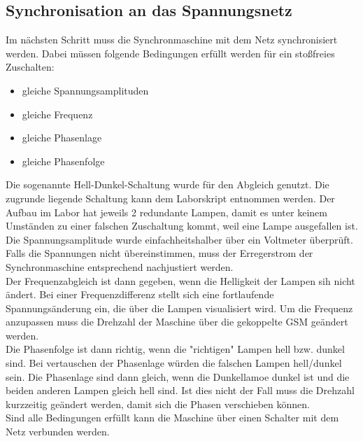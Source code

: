 \subsection{Synchronisation an das Spannungsnetz}
Im nächsten Schritt muss die Synchronmaschine mit dem Netz synchronisiert werden. Dabei müssen folgende Bedingungen erfüllt werden für ein stoßfreies Zuschalten:
\begin{itemize}
    \item gleiche Spannungsamplituden
    \item gleiche Frequenz
    \item gleiche Phasenlage
    \item gleiche Phasenfolge
\end{itemize}
Die sogenannte Hell-Dunkel-Schaltung wurde für den Abgleich genutzt. Die zugrunde liegende Schaltung kann dem Laborskript entnommen werden. Der Aufbau im Labor hat jeweils 2 redundante Lampen, damit es unter keinem Umständen zu einer falschen Zuschaltung kommt, weil eine Lampe ausgefallen ist.\\
Die Spannungsamplitude wurde einfachheitshalber über ein Voltmeter überprüft. Falls die Spannungen nicht übereinstimmen, muss der Erregerstrom der Synchronmaschine entsprechend nachjustiert werden.\\
Der Frequenzabgleich ist dann gegeben, wenn die Helligkeit der Lampen sih nicht ändert. Bei einer Frequenzdifferenz  stellt sich eine fortlaufende Spannungsänderung ein, die über die Lampen visualisiert wird. Um die Frequenz anzupassen muss die Drehzahl der Maschine über die gekoppelte GSM geändert werden.\\
Die Phasenfolge ist dann richtig, wenn die "richtigen" Lampen hell bzw. dunkel sind. Bei vertauschen der Phasenlage würden die falschen Lampen hell/dunkel sein. 
Die Phasenlage sind dann gleich, wenn die Dunkellamoe dunkel ist und die beiden anderen Lampen gleich hell sind. Ist dies nicht der Fall muss die Drehzahl kurzzeitig geändert werden, damit sich die Phasen verschieben können.\\
Sind alle Bedingungen erfüllt kann die Maschine über einen Schalter mit dem Netz verbunden werden.
